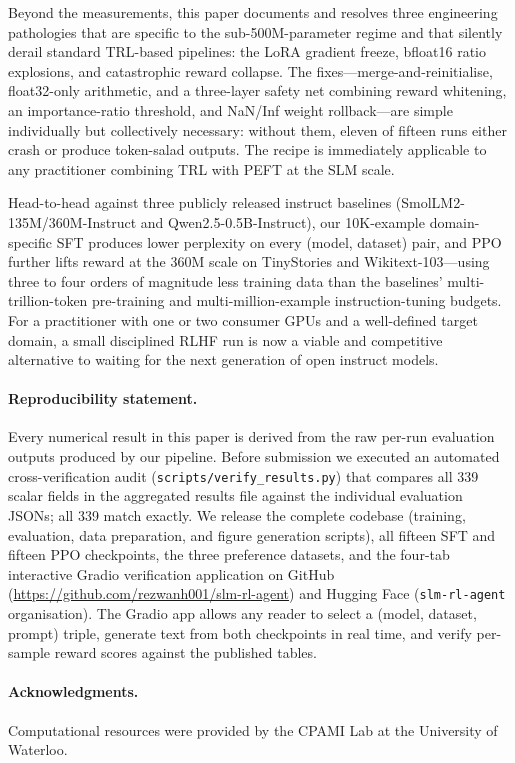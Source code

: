 \documentclass[10pt,twocolumn,letterpaper]{article}
\begin{document}
Beyond the measurements, this paper documents and resolves three engineering pathologies that are specific to the sub-500M-parameter regime and that silently derail standard TRL-based pipelines: the LoRA gradient freeze, bfloat16 ratio explosions, and catastrophic reward collapse. The fixes---merge-and-reinitialise, float32-only arithmetic, and a three-layer safety net combining reward whitening, an importance-ratio threshold, and NaN/Inf weight rollback---are simple individually but collectively necessary: without them, eleven of fifteen runs either crash or produce token-salad outputs. The recipe is immediately applicable to any practitioner combining TRL with PEFT at the SLM scale.

Head-to-head against three publicly released instruct baselines (SmolLM2-135M/360M-Instruct and Qwen2.5-0.5B-Instruct), our 10K-example domain-specific SFT produces lower perplexity on every (model, dataset) pair, and PPO further lifts reward at the 360M scale on TinyStories and Wikitext-103---using three to four orders of magnitude less training data than the baselines' multi-trillion-token pre-training and multi-million-example instruction-tuning budgets. For a practitioner with one or two consumer GPUs and a well-defined target domain, a small disciplined RLHF run is now a viable and competitive alternative to waiting for the next generation of open instruct models.

\paragraph{Reproducibility statement.}
Every numerical result in this paper is derived from the raw per-run evaluation outputs produced by our pipeline. Before submission we executed an automated cross-verification audit (\texttt{scripts/verify\_results.py}) that compares all 339 scalar fields in the aggregated results file against the individual evaluation JSONs; all 339 match exactly. We release the complete codebase (training, evaluation, data preparation, and figure generation scripts), all fifteen SFT and fifteen PPO checkpoints, the three preference datasets, and the four-tab interactive Gradio verification application on GitHub (\url{https://github.com/rezwanh001/slm-rl-agent}) and Hugging Face (\texttt{slm-rl-agent} organisation). The Gradio app allows any reader to select a (model, dataset, prompt) triple, generate text from both checkpoints in real time, and verify per-sample reward scores against the published tables.

\paragraph{Acknowledgments.}
Computational resources were provided by the CPAMI Lab at the University of Waterloo.

{\small


}
\end{document}
